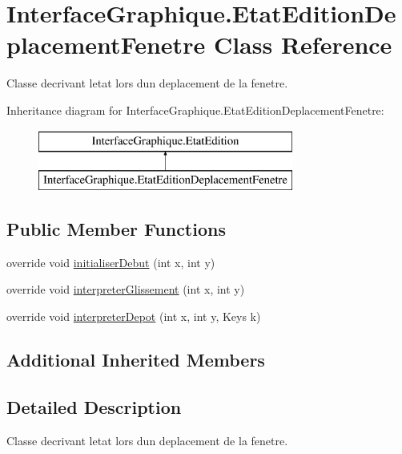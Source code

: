 \hypertarget{class_interface_graphique_1_1_etat_edition_deplacement_fenetre}{}\section{Interface\+Graphique.\+Etat\+Edition\+Deplacement\+Fenetre Class Reference}
\label{class_interface_graphique_1_1_etat_edition_deplacement_fenetre}


Classe decrivant l\textquotesingle{}etat lors d\textquotesingle{}un deplacement de la fenetre.  


Inheritance diagram for Interface\+Graphique.\+Etat\+Edition\+Deplacement\+Fenetre\+:\begin{figure}[H]
\begin{center}
\leavevmode
\includegraphics[height=2.000000cm]{class_interface_graphique_1_1_etat_edition_deplacement_fenetre}
\end{center}
\end{figure}
\subsection*{Public Member Functions}
\begin{DoxyCompactItemize}
\item 
override void \hyperlink{group__inf2990_ga3b56f73ff6944303866bc08d6f00d8d8}{initialiser\+Debut} (int x, int y)
\item 
override void \hyperlink{group__inf2990_gad13e7a9269ef5b704cd6732b08645c7e}{interpreter\+Glissement} (int x, int y)
\item 
override void \hyperlink{group__inf2990_ga45efdcabfec34cf74a82f4825aed8f7d}{interpreter\+Depot} (int x, int y, Keys k)
\end{DoxyCompactItemize}
\subsection*{Additional Inherited Members}


\subsection{Detailed Description}
Classe decrivant l\textquotesingle{}etat lors d\textquotesingle{}un deplacement de la fenetre. 

